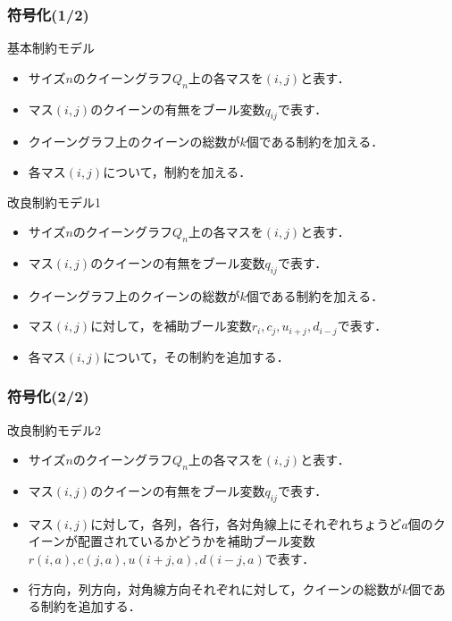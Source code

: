 \documentclass[dvipdfmx,10pt]{beamer}
\begin{document}
%
%

\begin{frame}\frametitle{符号化(1/2)}
 \begin{block}{基本制約モデル}
  \begin{itemize}
   \item サイズ$n$のクイーングラフ$Q_{n}$上の各マスを$(i,j)$と表す．
   \item マス$(i,j)$のクイーンの有無をブール変数$q_{ij}$で表す．
   \item クイーングラフ上のクイーンの総数が$k$個である制約を加える．
   \item 各マス$(i,j)$について，制約を加える．
  \end{itemize}
 \end{block}
 \begin{block}{改良制約モデル1}
  \begin{itemize}
   \item サイズ$n$のクイーングラフ$Q_{n}$上の各マスを$(i,j)$と表す．
   \item マス$(i,j)$のクイーンの有無をブール変数$q_{ij}$で表す．
   \item クイーングラフ上のクイーンの総数が$k$個である制約を加える．
   \item マス$(i,j)$に対して，を補助ブール変数$r_{i},c_{j},u_{i+j},d_{i-j}$で表す．
   \item 各マス$(i,j)$について，その制約を追加する．
  \end{itemize}
 \end{block}
\end{frame}

%
%

\begin{frame}\frametitle{符号化(2/2)}
 \begin{block}{改良制約モデル2}
  \begin{itemize}
   \item サイズ$n$のクイーングラフ$Q_{n}$上の各マスを$(i,j)$と表す．
   \item マス$(i,j)$のクイーンの有無をブール変数$q_{ij}$で表す．
   \item マス$(i,j)$に対して，各列，各行，各対角線上にそれぞれちょうど$a$個のクイーンが配置されているかどうかを補助ブール変数$r(i,a),c(j,a),u(i+j,a),d(i-j,a)$で表す．
   \item \alert{行方向，列方向，対角線方向それぞれに対して，クイーンの総数が$k$個}である制約を追加する．
  \end{itemize}
 \end{block}
\end{frame}
\end{document}
